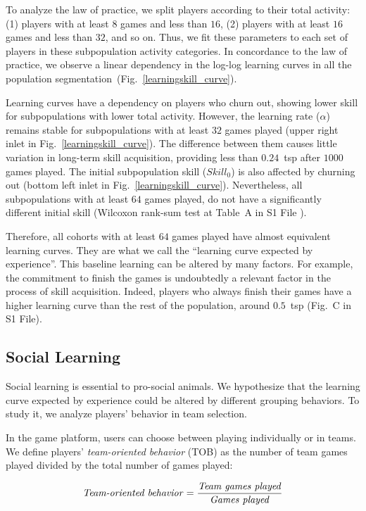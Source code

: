 \documentclass[a4paper,10pt]{book}
\theoremstyle{definition}
\begin{document}
To analyze the law of practice, we split players according to their total activity: (1) players with at least $8$ games and less than $16$, (2) players with at least $16$ games and less than $32$, and so on.
Thus, we fit these parameters to each set of players in these subpopulation activity categories.
In concordance to the law of practice, we observe a linear dependency in the log-log learning curves in all the population segmentation~(Fig.~\ref{learningskill_curve}).

Learning curves have a dependency on players who churn out, showing lower skill for subpopulations with lower total activity.
However, the learning rate ($\alpha$) remains stable for subpopulations with at least $32$ games played (upper right inlet in Fig.~\ref{learningskill_curve}).
The difference between them causes little variation in long-term skill acquisition, providing less than $0.24$~tsp after $1000$ games played.
The initial subpopulation skill ($Skill_0$) is also affected by churning out (bottom left inlet in Fig.~\ref{learningskill_curve}).
Nevertheless, all subpopulations with at least $64$ games played, do not have a significantly different initial skill (Wilcoxon rank-sum test at Table~A in S1 File ). 

Therefore, all cohorts with at least $64$ games played have almost equivalent learning curves.
They are what we call the ``learning curve expected by experience''.
This baseline learning can be altered by many factors. 
For example, the commitment to finish the games is undoubtedly a relevant factor in the process of skill acquisition.
Indeed, players who always finish their games have a higher learning curve than the rest of the population, around $0.5$~tsp (Fig.~C in S1 File).

\subsection{Social Learning}

Social learning is essential to pro-social animals.
We hypothesize that the learning curve expected by experience could be altered by different grouping behaviors. 
To study it, we analyze players' behavior in team selection.

In the game platform, users can choose between playing individually or in teams.
We define players' \emph{team-oriented behavior} (TOB) as the number of team games played divided by the total number of games played:

\begin{equation}
\text{\emph{Team-oriented behavior}} = \frac{\text{\emph{Team games played}}}{\text{\emph{Games played}}}
\end{equation}
\end{document}
